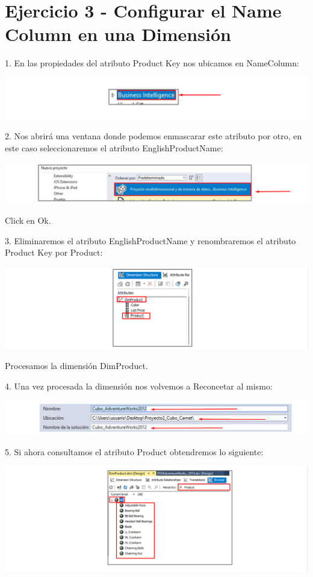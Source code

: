\section{Ejercicio 3 - Configurar el Name Column en una Dimensión}  

1. En las propiedades del atributo Product Key nos ubicamos en NameColumn:

	\begin{center}
	\includegraphics[width=\columnwidth]{images/task1/img1}
	\end{center}	


2. Nos abrirá una ventana donde podemos enmascarar este atributo por otro, en este caso seleccionaremos el
atributo EnglishProductName:

	\begin{center}
	\includegraphics[width=\columnwidth]{images/task1/img2}
	\end{center}	

Click en Ok.

3. Eliminaremos el atributo EnglishProductName y renombraremos el atributo Product Key por Product:

	\begin{center}
	\includegraphics[width=\columnwidth]{images/task1/img3}
	\end{center}	

Procesamos la dimensión DimProduct.

4. Una vez procesada la dimensión nos volvemos a Reconcetar al mismo:

	\begin{center}
	\includegraphics[width=\columnwidth]{images/task1/img4}
    \end{center}	

5. Si ahora consultamos el atributo Product obtendremos lo siguiente:

	\begin{center}
	\includegraphics[width=\columnwidth]{images/task1/img5}
    \end{center}	


    